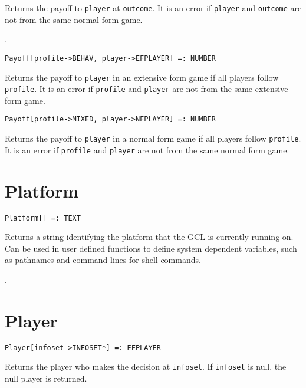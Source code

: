 \noindent
Returns the payoff to \verb+player+ at \verb+outcome+.  It is an error if
\verb+player+ and \verb+outcome+ are not from the same normal form game.

\seealso {}.

\newsignature

\begin{verbatim}
Payoff[profile->BEHAV, player->EFPLAYER] =: NUMBER 
\end{verbatim}

\noindent
Returns the payoff to \verb+player+ in an extensive form game if all
players follow \verb+profile+.  It is an error if \verb+profile+
and \verb+player+ are not from the same extensive form game.

\newsignature

\begin{verbatim}
Payoff[profile->MIXED, player->NFPLAYER] =: NUMBER 
\end{verbatim}

\noindent
Returns the payoff to \verb+player+ in a normal form game if all players
follow \verb+profile+.  It is an error if \verb+profile+ and \verb+player+
are not from the same normal form game.


\section*{Platform}\label{PrimPlatform}
\begin{verbatim}
Platform[] =: TEXT 
\end{verbatim}

Returns a string identifying the platform that the GCL is
currently running on.  Can be used in user defined functions to define
system dependent variables, such as pathnames and command lines for
shell commands.  

\seealso {}.


\section*{Player}\label{PrimPlayer}
\begin{verbatim}
Player[infoset->INFOSET*] =: EFPLAYER 
\end{verbatim}

\noindent
Returns the player who makes the decision at \verb+infoset+.
If \verb+infoset+ is null, the null player is returned.

